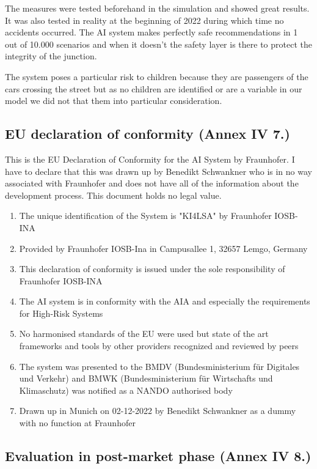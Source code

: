 The measures were tested beforehand in the simulation and showed great results. It was also tested in reality at the beginning of 2022 during which time no accidents occurred. The AI system makes perfectly safe recommendations in 1 out of 10.000 scenarios and when it doesn't the safety layer is there to protect the integrity of the junction.

The system poses a particular risk to children because they are passengers of the cars crossing the street but as no children are identified or are a variable in our model we did not that them into particular consideration.


\subsection{EU declaration of conformity (Annex IV 7.)}
This is the EU Declaration of Conformity for the AI System by Fraunhofer. I have to declare that this was drawn up by Benedikt Schwankner who is in no way associated with Fraunhofer and does not have all of the information about the development process. This document holds no legal value.
\begin{enumerate}
    \item The unique identification of the System is "KI4LSA" by Fraunhofer IOSB-INA
    \item Provided by Fraunhofer IOSB-Ina in Campusallee 1, 32657 Lemgo, Germany
    \item This declaration of conformity is issued under the sole responsibility of Fraunhofer IOSB-INA
    \item The AI system is in conformity with the AIA and especially the requirements for High-Risk Systems
    \item No harmonised standards of the EU were used but state of the art frameworks and tools by other providers recognized and reviewed by peers
    \item The system was presented to the BMDV (Bundesministerium für Digitales und Verkehr) and BMWK (Bundesministerium für Wirtschafts und Klimaschutz) was notified as a NANDO authorised body
    \item Drawn up in Munich on 02-12-2022 by Benedikt Schwankner as a dummy with no function at Fraunhofer
\end{enumerate}


\subsection{Evaluation in post-market phase (Annex IV 8.)}
  
